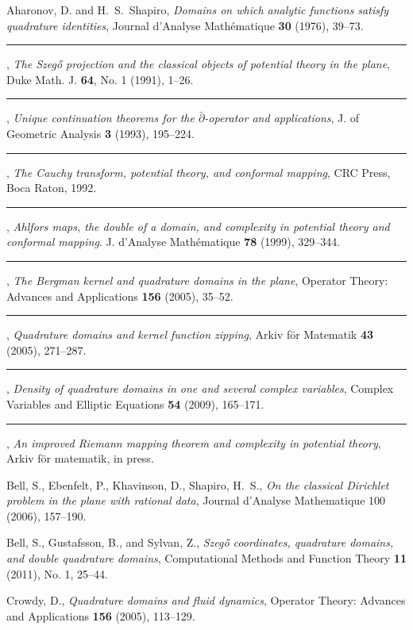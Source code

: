\documentclass[12pt]{amsart}
\numberwithin{equation}{section}
\begin{document}
\begin{thebibliography}{000}

Aharonov, D. and H.~S.~Shapiro,
{\em
Domains on which analytic functions satisfy quadrature identities},
Journal d'Analyse Math\'ematique {\bf 30} (1976), 39--73.

\rule{3em}{.5pt}\thinspace,
{\em
The Szeg\H o projection and the classical objects of potential theory
in the plane}, Duke Math. J. {\bf 64}, No. 1 (1991), 1--26.

\rule{3em}{.5pt}\thinspace,
{\em Unique continuation theorems for the $\bar\partial$-operator
and applications}, J. of  Geometric Analysis
{\bf 3} (1993), 195--224.

\rule{3em}{.5pt}\thinspace,
{\em The Cauchy transform, potential theory, and
conformal mapping}, CRC Press, Boca Raton, 1992.

\rule{3em}{.5pt}\thinspace,
{\em Ahlfors maps, the double of a domain, and complexity in
potential theory and conformal mapping}.  J. d'Analyse Math\'ematique
{\bf  78} (1999), 329--344.

\rule{3em}{.5pt}\thinspace,
{\em
The Bergman kernel and quadrature domains in the plane},
Operator Theory: Advances and Applications
{\bf 156} (2005), 35--52.

\rule{3em}{.5pt}\thinspace,
{\em
Quadrature domains and kernel function zipping},
Arkiv f\"or Matematik
{\bf 43} (2005), 271--287.

\rule{3em}{.5pt}\thinspace,
{\em
Density of quadrature domains in one and several complex variables},
Complex Variables and Elliptic Equations {\bf 54} (2009), 165--171.

\rule{3em}{.5pt}\thinspace,
{\em
An improved Riemann mapping theorem and complexity in potential
theory},
Arkiv f\"or matematik, in press.

Bell, S., Ebenfelt, P., Khavinson, D., Shapiro, H.~S.,
{\em On the classical Dirichlet problem in the plane with
rational data}, Journal d'Analyse Mathematique 100 (2006), 157--190.

Bell, S., Gustafsson, B., and Sylvan, Z.,
{\em Szeg\H o coordinates, quadrature domains, and double quadrature domains},
Computational Methods and Function Theory {\bf 11} (2011), No. 1, 25--44.

Crowdy, D.,
{\em Quadrature domains and fluid dynamics},
Operator Theory: Advances and Applications {\bf 156} (2005),
113--129.


\end{thebibliography}
\end{document}
